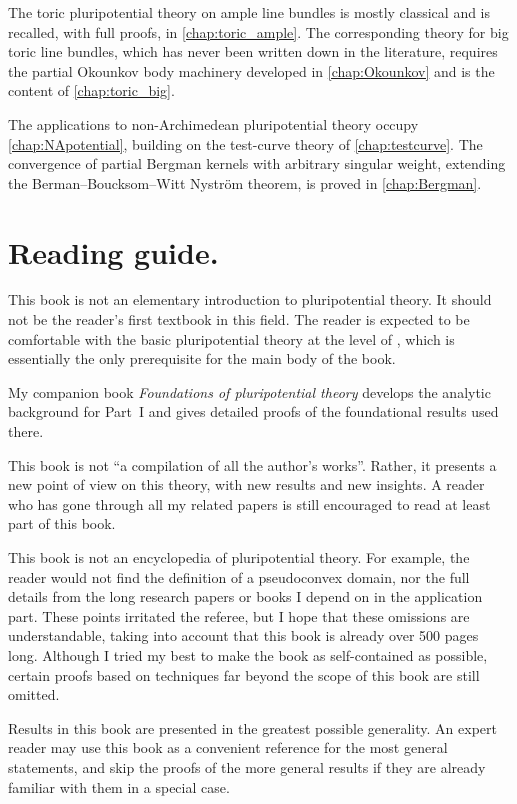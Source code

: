 The toric pluripotential theory on ample line bundles is mostly classical and is recalled, with full proofs, in \cref{chap:toric_ample}. The corresponding theory for big toric line bundles, which has never been written down in the literature, requires the partial Okounkov body machinery developed in \cref{chap:Okounkov} and is the content of \cref{chap:toric_big}.

The applications to non-Archimedean pluripotential theory occupy \cref{chap:NApotential}, building on the test-curve theory of \cref{chap:testcurve}. The convergence of partial Bergman kernels with arbitrary singular weight, extending the Berman--Boucksom--Witt Nyström theorem, is proved in \cref{chap:Bergman}.

\section*{Reading guide.}

This book is not an elementary introduction to pluripotential theory. It should not be the reader's first textbook in this field. The reader is expected to be comfortable with the basic pluripotential theory at the level of \cite{GZ17}, which is essentially the only prerequisite for the main body of the book.

My companion book \emph{Foundations of pluripotential theory} \cite{FPT} develops the analytic background for Part~I and gives detailed proofs of the foundational results used there.

This book is not ``a compilation of all the author's works''. Rather, it presents a new point of view on this theory, with new results and new insights. A reader who has gone through all my related papers is still encouraged to read at least part of this book.

This book is not an encyclopedia of pluripotential theory. For example, the reader would not find the definition of a pseudoconvex domain, nor the full details from the long research papers or books I depend on in the application part. These points irritated the referee, but I hope that these omissions are understandable, taking into account that this book is already over 500 pages long. Although I tried my best to make the book as self-contained as possible, certain proofs based on techniques far beyond the scope of this book are still omitted.

Results in this book are presented in the greatest possible generality. An expert reader may use this book as a convenient reference for the most general statements, and skip the proofs of the more general results if they are already familiar with them in a special case.

